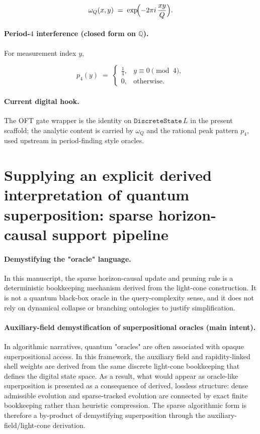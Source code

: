 \documentclass[11pt,a4paper]{article}
\theoremstyle{remark}
\begin{document}
\begin{equation}
  \omega_{Q}(x,y) \;=\; \exp\!\Bigl(-2\pi i\,\frac{xy}{Q}\Bigr).
\end{equation}

\paragraph{Period-$4$ interference (closed form on $\mathbb{Q}$).}
For measurement index $y$,

\begin{equation}
  p_4(y) \;=\;
  \begin{cases}
    \tfrac14, & y\equiv 0 \pmod 4,\\
    0, & \text{otherwise}.
  \end{cases}
\end{equation}

\paragraph{Current digital hook.}
The OFT gate wrapper is the identity on $\texttt{DiscreteState}\,L$ in the present scaffold; the analytic content is carried by $\omega_Q$ and the rational peak pattern $p_4$, used upstream in period-finding style oracles.

\section{Supplying an explicit derived interpretation of quantum superposition: sparse horizon-causal support pipeline}
\label{sec:sparse-pipeline}

\paragraph{Demystifying the "oracle" language.}
In this manuscript, the sparse horizon-causal update and pruning rule is a deterministic bookkeeping mechanism derived from the light-cone construction. It is not a quantum black-box oracle in the query-complexity sense, and it does not rely on dynamical collapse or branching ontologies to justify simplification.

\paragraph{Auxiliary-field demystification of superpositional oracles (main intent).}
In algorithmic narratives, quantum "oracles" are often associated with opaque superpositional access. In this framework, the auxiliary field and rapidity-linked shell weights are derived from the same discrete light-cone bookkeeping that defines the digital state space. As a result, what would appear as oracle-like superposition is presented as a consequence of derived, lossless structure: dense admissible evolution and sparse-tracked evolution are connected by exact finite bookkeeping rather than heuristic compression. The sparse algorithmic form is therefore a by-product of demystifying superposition through the auxiliary-field/light-cone derivation.
\end{document}
